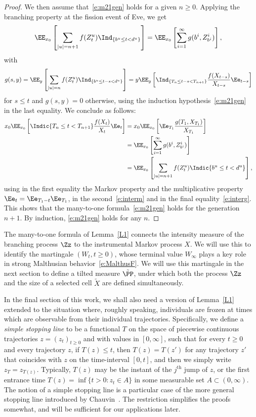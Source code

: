 \begin{proof}
We then assume that~\eqref{e:m21gen} holds for a given $n\geq 0$. Applying the branching property at the fission event of Eve, we get
\[
\EE_{x_0} \left[\sum_{|u|=n+1} f(Z^u_t) \Ind_{\{b^u \leq t < d^u\}} \right]=
\EE_{x_0}\left[\sum_{i=1}^{\infty} g(b^i, Z^i_{b^i})\right],
\]
with
\begin{equation}\label{e:interg}
g(s,y)= \EE_{y} \left[\sum_{|u|=n} f(Z^u_t) \Ind_{\{b^u \leq t-s < d^u\}} \right] = y\EE_y\left[\Ind_{\{T_n \leq t-s < T_{n+1}\}}\frac{f(X_{t-s})}{X_{t-s}}\Ee_{t-s}
\right]
\end{equation}
for $s\leq t$ and $g(s,y)=0$ otherwise, using the induction hypothesis~\eqref{e:m21gen} in the last equality. We conclude as follows:
\begin{align*}
x_0 \EE_{x_0}\left[\Indic{T_n\le t < T_{n+1}} \frac{f(X_t)}{X_t} \Ee_t \right] &= x_0 \EE_{x_0}\left[\Ee_{T_1} \frac{g(T_1,X_{T_1})}{X_{T_1}} \right]
\\
&=
\EE_{x_0}\left[\sum_{i=1}^\infty g(b^i,Z^i_{b^i}) \right]
\\
&=
\EE_{x_0}\left[\sum_{\lvert u \rvert = n+1} f(Z^u_t) \Indic{b^u\le t<d^u}\right],
\end{align*}
using in the first equality the Markov property and the multiplicative property $\Ee_{t} = \Ee_{T_1-t}\Ee_{T_1}$, in the second~\eqref{e:interm} and in the final equality~\eqref{e:interg}. This shows that the many-to-one formula~\eqref{e:m21gen} holds for the generation $n+1$. By induction, \eqref{e:m21gen} holds for any $n$.
\end{proof}

The many-to-one formula of Lemma~\ref{L1} connects the intensity measure of the branching process $\Zz$ to the instrumental Markov process $X$. We will use this to identify the martingale $(W_t, t\geq 0)$, whose terminal value $W_{\infty}$ plays a key role in strong Malthusian behavior~\eqref{e:MalthusF}. We will use this martingale in the next section to define a tilted measure $\tilde \PP$, under which both the process $\Zz$ and the size of a selected cell $\tilde{X}$ are defined simultaneously.

In the final section of this work, we shall also need a version of Lemma~\ref{L1} extended to the situation where, roughly speaking, individuals are frozen at times which are observable from their individual trajectories. Specifically, we define a \emph{simple stopping line} to be a functional $T$ on the space of piecewise continuous trajectories $z=(z_t)_{t\geq 0}$ and with values in $[0,\infty]$, such that for every $t\geq 0$ and every trajectory $z$, if $T(z)\leq t$, then $T(z)=T(z')$ for any trajectory $z'$ that coincides with $z$ on the time-interval $[0,t]$, and then we simply write $z_T=z_{T(z)}$. Typically, $T(z)$ may be the instant of the $j^{\text{th}}$ jump of $z$, or the first entrance time $T(z)=\inf\{t>0: z_t\in A\}$ in some measurable set $A\subset (0,\infty)$. The notion of a simple stopping line is a particular case of the more general stopping line introduced by Chauvin~\cite{Cha-stop}. The restriction simplifies the proofs somewhat, and will be sufficient for our applications later.


